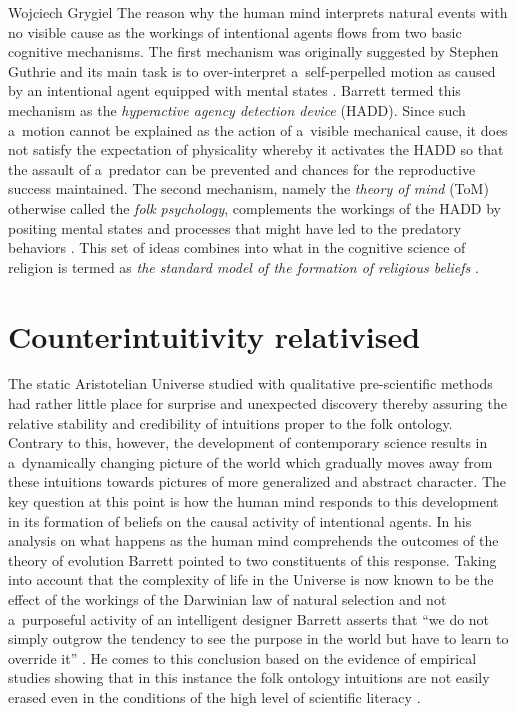 \begin{artengenv}{Wojciech Grygiel}
The reason why the human mind interprets natural events with no visible cause as the workings of intentional agents flows from two basic cognitive mechanisms. The first mechanism was originally suggested by Stephen Guthrie and its main task is to over-interpret a~self-perpelled motion as caused by an intentional agent equipped with mental states
\parencite[][]{guthrie_faces_1993}. %
 Barrett 
\parencite*[][]{barrett_exploring_2000} %
 termed this mechanism as the \textit{hyperactive agency detection device} (HADD). Since such a~motion cannot be explained as the action of a~visible mechanical cause, it does not satisfy the expectation of physicality whereby it activates the HADD so that the assault of a~predator can be prevented and chances for the reproductive success maintained. The second mechanism, namely the \textit{theory of mind} (ToM) otherwise called the \textit{folk psychology}, complements the workings of the HADD by positing mental states and processes that might have led to the predatory behaviors 
\parencite[e.g.][pp.74–77]{barrett_cognitive_2011}. %
 This set of ideas combines into what in the cognitive science of religion is termed as \textit{the standard model of the formation of religious beliefs} 
\parencite[][pp.183–189]{murray_evolutionary_2010}. %


\section*{Counterintuitivity relativised}
The static Aristotelian Universe studied with qualitative pre-scientific methods had rather little place for surprise and unexpected discovery thereby assuring the relative stability and credibility of intuitions proper to the folk ontology. Contrary to this, however, the development of contemporary science results in a~dynamically changing picture of the world which gradually moves away from these intuitions towards pictures of more generalized and abstract character. The key question at this point is how the human mind responds to this development in its formation of beliefs on the causal activity of intentional agents. In his analysis on what happens as the human mind comprehends the outcomes of the theory of evolution Barrett pointed to two constituents of this response. Taking into account that the complexity of life in the Universe is now known to be the effect of the workings of the Darwinian law of natural selection and not a~purposeful activity of an intelligent designer Barrett asserts that ``we do not simply outgrow the tendency to see the purpose in the world but have to learn to override it''
\parencite[][p.71]{barrett_cognitive_2011}. %
 He comes to this conclusion based on the evidence of empirical studies showing that in this instance the folk ontology intuitions are not easily erased even in the conditions of the high level of scientific literacy 
\parencite[e.g.][]{casler_developmental_2008}.%



\end{artengenv}
